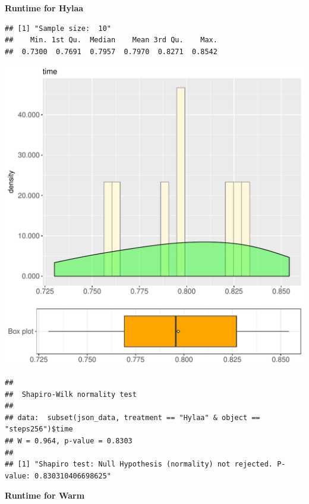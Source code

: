 \documentclass{article}\usepackage[]{graphicx}\usepackage[]{color}
\makeatletter
\def\maxwidth{ %
  \ifdim\Gin@nat@width>\linewidth
    \linewidth
  \else
    \Gin@nat@width
  \fi
}
\newenvironment{kframe}{%
 \def\at@end@of@kframe{}%
 \ifinner\ifhmode%
  \def\at@end@of@kframe{\end{minipage}}%
  \begin{minipage}{\columnwidth}%
 \fi\fi%
 \def\FrameCommand##1{\hskip\@totalleftmargin \hskip-\fboxsep
 \colorbox{shadecolor}{##1}\hskip-\fboxsep
     \hskip-\linewidth \hskip-\@totalleftmargin \hskip\columnwidth}%
 \MakeFramed {\advance\hsize-\width
   \@totalleftmargin\z@ \linewidth\hsize
   \@setminipage}}%
 {\par\unskip\endMakeFramed%
 \at@end@of@kframe}
\newenvironment{knitrout}{}{} %
\makeatother
\begin{document}
 \textbf{Runtime for Hylaa}
\begin{knitrout}
\color{fgcolor}\begin{kframe}
\begin{verbatim}
## [1] "Sample size:  10"
##    Min. 1st Qu.  Median    Mean 3rd Qu.    Max. 
##  0.7300  0.7691  0.7957  0.7970  0.8271  0.8542
\end{verbatim}
\end{kframe}
\includegraphics[width=\maxwidth]{figure/RH1_Hylaa_steps256-1} 
\begin{kframe}\begin{verbatim}
## 
## 	Shapiro-Wilk normality test
## 
## data:  subset(json_data, treatment == "Hylaa" & object == "steps256")$time
## W = 0.964, p-value = 0.8303
## 
## [1] "Shapiro test: Null Hypothesis (normality) not rejected. P-value: 0.830310406698625"
\end{verbatim}
\end{kframe}
\end{knitrout}
 \textbf{Runtime for Warm}
\end{document}
